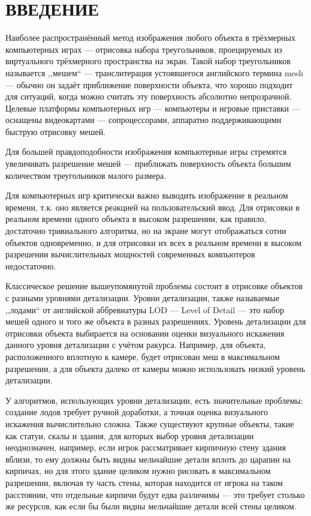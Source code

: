\clearpage
\section{ВВЕДЕНИЕ}
Наиболее распространённый метод изображения любого объекта в трёхмерных компьютерных играх --- отрисовка набора треугольников, проецируемых из виртуального трёхмерного пространства на экран.
Такой набор треугольников называется ,,мешем`` --- транслитерация устоявшегося английского термина mesh --- обычно он задаёт приближение поверхности объекта, что хорошо подходит для ситуаций, когда можно считать эту поверхность абсолютно непрозрачной.
Целевые платформы компьютерных игр --- компьютеры и игровые приставки --- оснащены видеокартами --- сопроцессорами, аппаратно поддерживающими быструю отрисовку мешей.

Для большей правдоподобности изображения компьютерные игры стремятся увеличивать разрешение мешей --- приближать поверхность объекта большим количеством треугольников малого размера.

Для компьютерных игр критически важно выводить изображение в реальном времени, т.к. оно является реакцией на пользовательский ввод.
Для отрисовки в реальном времени одного объекта в высоком разрешении, как правило, достаточно тривиального алгоритма, но на экране могут отображаться сотни объектов одновременно, и для отрисовки их всех в реальном времени в высоком разрешении вычислительных мощностей современных компьютеров недостаточно.

Классическое решение вышеупомянутой проблемы состоит в отрисовке объектов с разными уровнями детализации.
Уровни детализации, также называемые ,,лодами`` от английской аббревиатуры LOD --- Level of Detail --- это набор мешей одного и того же объекта в разных разрешениях.
Уровень детализации для отрисовки объекта выбирается на основании оценки визуального искажения данного уровня детализации с учётом ракурса.
Например, для объекта, расположенного вплотную к камере, будет отрисован меш в максимальном разрешении, а для объекта далеко от камеры можно использовать низкий уровень детализации.

У алгоритмов, использующих уровни детализации, есть значительные проблемы: создание лодов требует ручной доработки, а точная оценка визуального искажения вычислительно сложна.
Также существуют крупные объекты, такие как статуи, скалы и здания, для которых выбор уровня детализации неоднозначен, например, если игрок рассматривает кирпичную стену здания вблизи, то ему должны быть видны мельчайшие детали вплоть до царапин на кирпичах, но для этого здание целиком нужно рисовать в максимальном разрешении, включая ту часть стены, которая находится от игрока на таком расстоянии, что отдельные кирпичи будут едва различимы --- это требует столько же ресурсов, как если бы были видны мельчайшие детали всей стены целиком.

